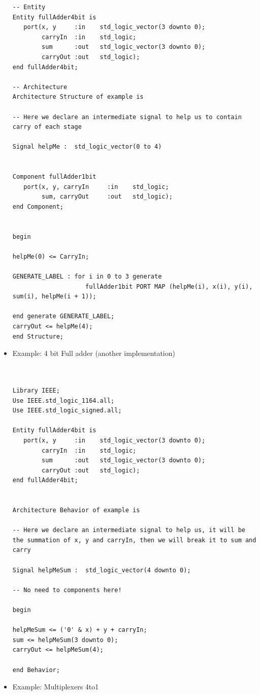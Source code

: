 \documentclass[a4paper]{article}
\begin{document}
\begin{itemize}
\begin{verbatim}
-- Entity
Entity fullAdder4bit is 
   port(x, y     :in    std_logic_vector(3 downto 0);
        carryIn  :in    std_logic;
        sum      :out   std_logic_vector(3 downto 0);
        carryOut :out   std_logic);
end fullAdder4bit;

-- Architecture
Architecture Structure of example is

-- Here we declare an intermediate signal to help us to contain carry of each stage

Signal helpMe :  std_logic_vector(0 to 4)


Component fullAdder1bit
   port(x, y, carryIn     :in    std_logic;
        sum, carryOut     :out   std_logic);
end Component;


begin

helpMe(0) <= CarryIn;

GENERATE_LABEL : for i in 0 to 3 generate
                    fullAdder1bit PORT MAP (helpMe(i), x(i), y(i), sum(i), helpMe(i + 1)); 
               
end generate GENERATE_LABEL;     
carryOut <= helpMe(4);
end Structure;

\end{verbatim}


\item Example: 4 bit Full adder (another implementation)
\begin{verbatim}


Library IEEE;
Use IEEE.std_logic_1164.all;
Use IEEE.std_logic_signed.all;

Entity fullAdder4bit is 
   port(x, y     :in    std_logic_vector(3 downto 0);
        carryIn  :in    std_logic;
        sum      :out   std_logic_vector(3 downto 0);
        carryOut :out   std_logic);
end fullAdder4bit;


Architecture Behavior of example is

-- Here we declare an intermediate signal to help us, it will be the summation of x, y and carryIn, then we will break it to sum and carry

Signal helpMeSum :  std_logic_vector(4 downto 0);

-- No need to components here!

begin

helpMeSum <= ('0' & x) + y + carryIn;
sum <= helpMeSum(3 downto 0);
carryOut <= helpMeSum(4);

end Behavior;

\end{verbatim}


\item Example: Multiplexers 4to1
\begin{verbatim}


\end{verbatim}
\end{itemize}
\end{document}
